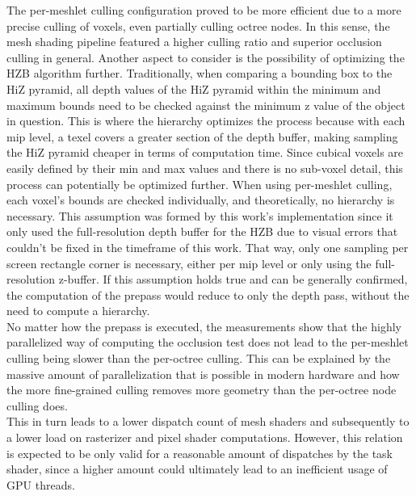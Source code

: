 \noindent
The per-meshlet culling configuration proved to be more efficient due to a more precise culling of voxels, even partially 
culling octree nodes. In this sense, the mesh shading pipeline featured a higher culling ratio and superior occlusion 
culling in general. Another aspect to consider is the possibility of optimizing the \ac{HZB} algorithm further. 
Traditionally, when comparing a bounding box to the \ac{HiZ} pyramid, all depth values of the \ac{HiZ} pyramid within the 
minimum and maximum bounds need to be checked against the minimum z value of the object in question. This is where the 
hierarchy optimizes the process because with each mip level, a texel covers a greater section of the depth buffer, making 
sampling the \ac{HiZ} pyramid cheaper in terms of computation time. Since cubical voxels are easily defined by their min 
and max values and there is no sub-voxel detail, this process can potentially be optimized further. When using per-meshlet 
culling, each voxel's bounds are checked individually, and theoretically, no hierarchy is necessary. This assumption was 
formed by this work's implementation since it only used the full-resolution depth buffer for the \ac{HZB} due to visual 
errors that couldn't be fixed in the timeframe of this work. That way, only one sampling per screen rectangle corner is 
necessary, either per mip level or only using the full-resolution z-buffer. If this assumption holds true and can be 
generally confirmed, the computation of the prepass would reduce to only the depth pass, without the need to compute a 
hierarchy. \\

\noindent
No matter how the prepass is executed, the measurements show that the highly parallelized way of computing the occlusion 
test does not lead to the per-meshlet culling being slower than the per-octree culling. This can be explained by the 
massive amount of parallelization that is possible in modern hardware and how the more fine-grained culling removes more 
geometry than the per-octree node culling does. \\

\noindent
This in turn leads to a lower dispatch count of mesh shaders and 
subsequently to a lower load on rasterizer and pixel shader computations. However, this relation is expected to be only 
valid for a reasonable amount of dispatches by the task shader, since a higher amount could ultimately lead to an 
inefficient usage of \ac{GPU} threads. \\

